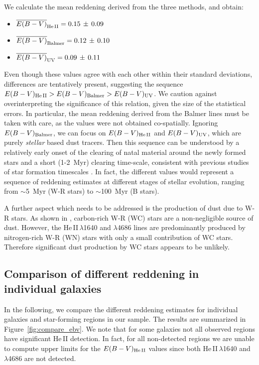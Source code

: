 \documentclass[]{aastex63}
\begin{document}
We calculate the mean reddening derived from the three methods, and obtain:
\begin{itemize}
    \item \;$\overline{E(B-V)}_{\rm He\,II} = 0.15\,\pm\,0.09$  \item \;$\overline{E(B-V)}_{\rm Balmer} = 0.12\,\pm\,0.10$
    \item \;$\overline{E(B-V)}_{\rm UV} = 0.09\,\pm\,0.11$
\end{itemize}
%
Even though these values agree with each other within their standard deviations, differences are tentatively present, suggesting the sequence
$E(B-V)_{\rm He\,II} > E(B-V)_{\rm Balmer} > E(B-V)_{\rm UV}$. We caution against overinterpreting the significance of this relation, given the size of the statistical errors. In particular, the mean reddening derived from the Balmer lines must be taken with care, as the values were not obtained co-spatially. Ignoring $E(B-V)_{\rm Balmer}$, we can focus on $E(B-V)_{\rm He\,II}$ and $E(B-V)_{\rm UV}$, which are purely {\it stellar} based dust tracers. Then this sequence can be understood by a relatively early onset of the clearing of natal material around the newly formed stars and a short (1-2~Myr) clearing time-scale, consistent with previous studies of star formation timescales \citep[e.g.,][]{whitmore_using_2011,hollyhead_studying_2015, sokal_prevalence_2016,hannon_h_2022}. In fact, the different values would represent a sequence of reddening estimates at different stages of stellar evolution, ranging from $\sim$5~Myr (W-R stars) to $\sim$100~Myr (B stars).

A further aspect which needs to be addressed is the production of dust due to W-R stars. As shown in \citet{lau_revisiting_2020,lau_nested_2022}, carbon-rich W-R (WC) stars are a non-negligible source of dust. However, the He\,II\,$\lambda$1640 and $\lambda$4686 lines are predominantly produced by nitrogen-rich W-R (WN) stars with only a small contribution of WC stars. 
Therefore significant dust production by WC stars appears to be unlikely.

\subsection{Comparison of different reddening in individual galaxies}

In the following, we compare the different reddening estimates for individual galaxies and star-forming regions in our sample. The results are summarized in Figure~\ref{fig:compare_ebv}. We note that for some galaxies not all observed regions have significant He\,II detection. In fact, for all non-detected regions we are unable to compute upper limits for the $E(B-V)_{\rm He\,II}$ values since both He\,II\,$\lambda$1640 and $\lambda$4686 are not detected.
\end{document}
